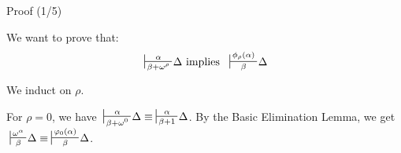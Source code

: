 \documentclass[10pt]{beamer}
\newcommand{\sintcons}[2]{\;\sststile{#2}{#1}\!}
\begin{document}
\begin{frame}{Proof (1/5)}


We want to prove that:
$$
\sintcons{\alpha}{\beta+\omega^\rho} \Delta \text{ implies }
\sintcons{\phi_\rho(\alpha)}{\beta} \Delta
$$
\pause


We induct on $\rho$.
\pause

For $\rho = 0$, we have $\sintcons{\alpha}{\beta + \omega^0} \Delta \equiv \sintcons{\alpha}{\beta +1} \Delta$.
By the Basic Elimination Lemma, we get
$\sintcons{\omega^\alpha}{\beta}\Delta
\equiv \sintcons{\varphi_0(\alpha)}{\beta} \Delta$.


\end{frame}

\end{document}
